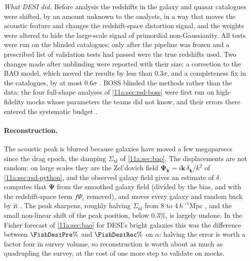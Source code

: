 \emph{What DESI did.} Before analysis the redshifts in the galaxy and quasar
catalogues were shifted, by an amount unknown to the analysts, in a way that
moves the acoustic feature and changes the redshift-space distortion signal, and
the weights were altered to hide the large-scale signal of primordial
non-Gaussianity. All tests were run on the blinded catalogues; only after the
pipeline was frozen and a prescribed list of validation tests had passed were
the true redshifts used. Two changes made after unblinding were reported with
their size: a correction to the BAO model, which moved the results by less than
$0.3\sigma$, and a completeness fix in the catalogues, by at most $0.6\sigma$
. BOSS blinded the methods rather than the data: the
four full-shape analyses of \cref{11a:sec:rsd-boss} were first run on
high-fidelity mocks whose parameters the teams did not know, and their errors
there entered the systematic budget .

\paragraph{Reconstruction.}
The acoustic peak is blurred because galaxies have moved a few megaparsecs since
the drag epoch, the damping $\Sigma_{\mathrm{nl}}$ of \cref{11a:sec:bao}. The
displacements are not random: on large scales they are the Zel'dovich field
$\bm\Psi_{\bm k}=i\bm k\,\delta_{\bm k}/k^2$ of \cref{11a:sec:rsd-python}, and the
observed galaxy field gives an estimate of $\delta$. 
computes that $\bm\Psi$ from the smoothed galaxy field (divided by the bias, and
with the redshift-space term $f\Psi_z$ removed), and moves every galaxy and
random back by it . The peak sharpens, roughly halving
$\Sigma_{\mathrm{nl}}$ from $8$ to $4\,h^{-1}$Mpc ,
and the small non-linear shift of the peak position, below $0.3\%$, is largely
undone. In the Fisher forecast of \cref{11a:sec:bao} for DESI's bright galaxies
this was the difference between $\FishDesiPre\%$ and $\FishDesiRec\%$ on $\alpha$:
halving the error is worth a factor four in survey volume, so reconstruction is
worth about as much as quadrupling the survey, at the cost of one more step to validate on mocks.

